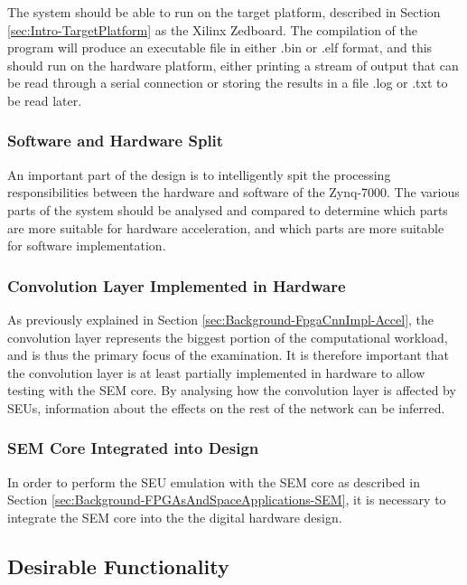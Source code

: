 \documentclass[12pt]{article}
\begin{document}
The system should be able to run on the target platform, described in Section \ref{sec:Intro-TargetPlatform} as the Xilinx Zedboard. The compilation of the program will produce an executable file in either .bin or .elf format, and this should run on the hardware platform, either printing a stream of output that can be read through a serial connection or storing the results in a file .log or .txt to be read later.

\subsubsection{Software and Hardware Split}
\label{sec:ProjSpec-Necessary-split}

An important part of the design is to intelligently spit the processing responsibilities between the hardware and software of the Zynq-7000. The various parts of the system should be analysed and compared to determine which parts are more suitable for hardware acceleration, and which parts are more suitable for software implementation.

\subsubsection{Convolution Layer Implemented in Hardware}
\label{sec:ProjSpec-Necessary-Conv}

As previously explained in Section \ref{sec:Background-FpgaCnnImpl-Accel}, the convolution layer represents the biggest portion of the computational workload, and is thus the primary focus of the examination. It is therefore important that the convolution layer is at least partially implemented in hardware to allow testing with the SEM core. By analysing how the convolution layer is affected by SEUs, information about the effects on the rest of the network can be inferred.

\subsubsection{SEM Core Integrated into Design}
\label{sec:ProjSpec-Necessary-SEM}

In order to perform the SEU emulation with the SEM core as described in Section \ref{sec:Background-FPGAsAndSpaceApplications-SEM}, it is necessary to integrate the SEM core into the the digital hardware design. 

\subsection{Desirable Functionality}
\label{sec:ProjSpec-Desirable}
\end{document}

